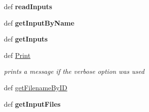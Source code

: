 \begin{CompactItemize}
\item 
\hypertarget{classtools_1_1XMLConfigParser_1_1Configuration_d0b3cceaf5365dfc431906b6197e403c}{
def \textbf{readInputs}}
\label{classtools_1_1XMLConfigParser_1_1Configuration_d0b3cceaf5365dfc431906b6197e403c}

\item 
\hypertarget{classtools_1_1XMLConfigParser_1_1Configuration_ec4c80ef50a7d602324fdd4af5d38242}{
def \textbf{getInputByName}}
\label{classtools_1_1XMLConfigParser_1_1Configuration_ec4c80ef50a7d602324fdd4af5d38242}

\item 
\hypertarget{classtools_1_1XMLConfigParser_1_1Configuration_0dda40721e890a272e9efb1c6f18a900}{
def \textbf{getInputs}}
\label{classtools_1_1XMLConfigParser_1_1Configuration_0dda40721e890a272e9efb1c6f18a900}

\item 
def \hyperlink{classtools_1_1XMLConfigParser_1_1Configuration_44a96475982c563c0cab590fff156072}{Print}
\begin{CompactList}\small\item\em prints a message if the verbose option was used \item\end{CompactList}\item 
def \hyperlink{classtools_1_1XMLConfigParser_1_1Configuration_4af93add61ddf66d1d48e96f50a506cc}{getFilenameByID}
\item 
\hypertarget{classtools_1_1XMLConfigParser_1_1Configuration_e8489275e514f7830a4c717ea589465b}{
def \textbf{getInputFiles}}
\label{classtools_1_1XMLConfigParser_1_1Configuration_e8489275e514f7830a4c717ea589465b}

\end{CompactItemize}
